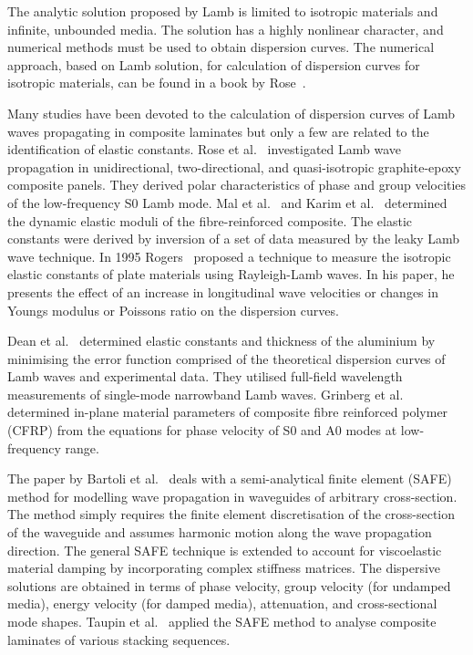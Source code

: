 	The analytic solution proposed by Lamb is limited to isotropic materials and infinite, unbounded media. The solution has a highly nonlinear character, and numerical methods must be used to obtain dispersion curves. The numerical approach, based on Lamb solution, for calculation of dispersion curves for isotropic materials, can be found in a book by Rose~\cite{Rose1999}.
	
	Many studies have been devoted to the calculation of dispersion curves of Lamb waves propagating in composite laminates but only a few are related to the identification of elastic constants. Rose et al.~\cite{Rose1987} investigated Lamb wave propagation in unidirectional, two-directional, and quasi-isotropic graphite-epoxy composite panels. They derived polar characteristics of phase and group velocities of the low-frequency S0 Lamb mode. Mal et al.~\cite{Mal1993} and Karim et al.~\cite{Karim1990} determined the dynamic elastic moduli of the fibre-reinforced composite. The elastic constants were derived by inversion of a set of data measured by the leaky Lamb wave technique. In 1995 Rogers~\cite{Rogers1995} proposed a technique to measure the isotropic elastic constants of plate materials using Rayleigh-Lamb waves. In his paper, he presents the effect of an increase in longitudinal wave velocities or changes in Youngs modulus or Poissons ratio on the dispersion curves.
	
	Dean et al.~\cite{Dean2008} determined elastic constants and thickness of the aluminium by minimising the error function comprised of the theoretical dispersion curves of Lamb waves and experimental data. They utilised full-field wavelength measurements of single-mode narrowband Lamb waves. Grinberg et al.~\cite{Grimberg2010} determined in-plane material parameters of composite fibre reinforced polymer (CFRP) from the equations for phase velocity of S0 and A0 modes at low-frequency range. 
	
	The paper by Bartoli et al.~\cite{Bartoli2006} deals with a semi-analytical finite element (SAFE) method for modelling wave propagation in waveguides of arbitrary cross-section. The method simply requires the finite element discretisation of the cross-section of the waveguide and assumes harmonic motion along the wave propagation direction. The general SAFE technique is extended to account for viscoelastic material damping by incorporating complex stiffness matrices. The dispersive solutions are obtained in terms of phase velocity, group velocity (for undamped media), energy velocity (for damped media), attenuation, and cross-sectional mode shapes. Taupin et al.~\cite{Taupin2011} applied the SAFE method to analyse composite laminates of various stacking sequences.
	
